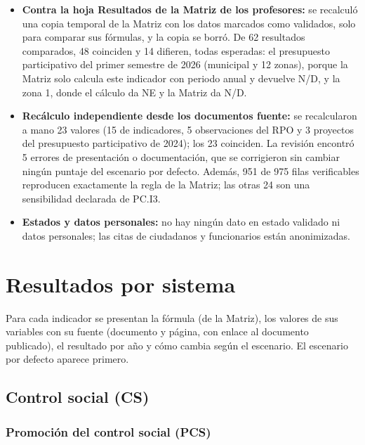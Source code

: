 \documentclass[11pt,letterpaper]{article}
\begin{document}
\begin{itemize}

\item \textbf{Contra la hoja Resultados de la Matriz de los profesores:} se recalculó una copia temporal de la Matriz con los datos marcados como validados, solo para comparar sus fórmulas, y la copia se borró. De 62 resultados comparados, 48 coinciden y 14 difieren, todas esperadas: el presupuesto participativo del primer semestre de 2026 (municipal y 12 zonas), porque la Matriz solo calcula este indicador con periodo anual y devuelve N/D, y la zona 1, donde el cálculo da NE y la Matriz da N/D.

\item \textbf{Recálculo independiente desde los documentos fuente:} se recalcularon a mano 23 valores (15 de indicadores, 5 observaciones del RPO y 3 proyectos del presupuesto participativo de 2024); los 23 coinciden. La revisión encontró 5 errores de presentación o documentación, que se corrigieron sin cambiar ningún puntaje del escenario por defecto. Además, 951 de 975 filas verificables reproducen exactamente la regla de la Matriz; las otras 24 son una sensibilidad declarada de PC.I3.

\item \textbf{Estados y datos personales:} no hay ningún dato en estado validado ni datos personales; las citas de ciudadanos y funcionarios están anonimizadas.

\end{itemize}

\section{Resultados por sistema}

Para cada indicador se presentan la fórmula (de la Matriz), los valores de sus variables con su fuente (documento y página, con enlace al documento publicado), el resultado por año y cómo cambia según el escenario. El escenario por defecto aparece primero.

\subsection{Control social (CS)}

\subsubsection*{Promoción del control social (PCS)}
\end{document}
